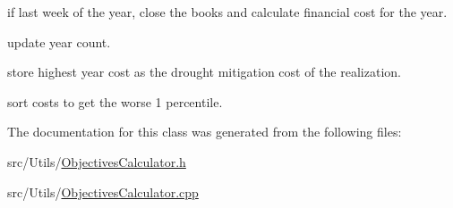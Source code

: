 if last week of the year, close the books and calculate financial cost for the year.

update year count.

store highest year cost as the drought mitigation cost of the realization.

sort costs to get the worse 1 percentile. 

The documentation for this class was generated from the following files\+:\begin{DoxyCompactItemize}
\item 
src/\+Utils/\mbox{\hyperlink{ObjectivesCalculator_8h}{Objectives\+Calculator.\+h}}\item 
src/\+Utils/\mbox{\hyperlink{ObjectivesCalculator_8cpp}{Objectives\+Calculator.\+cpp}}\end{DoxyCompactItemize}
